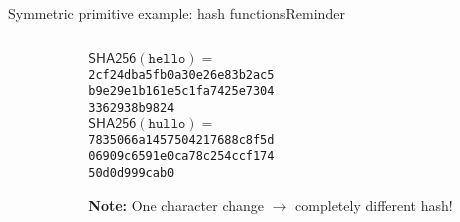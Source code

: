 \documentclass[aspectratio=169, lualatex, handout]{beamer}
\begin{document}
\begin{frame}{Symmetric primitive example: hash functions}{Reminder}
	\begin{columns}[c]
		\begin{column}{0.55\textwidth}
		\end{column}
		\begin{column}{0.45\textwidth}
			\begin{tcolorbox}
				[colback=black!5!white,colframe=ciphergray] $\mathsf{SHA256}(\texttt{hello}) =$ \\ {\small\texttt{2cf24dba5fb0a30e26e83b2ac5}\\ \texttt{b9e29e1b161e5c1fa7425e7304}\\
				\texttt{3362938b9824}}\\[1em]
				$\mathsf{SHA256}(\texttt{hullo}) =$ \\ {\small\texttt{7835066a1457504217688c8f5d}\\
				\texttt{06909c6591e0ca78c254ccf174}\\ \texttt{50d0d999cab0}}
			\end{tcolorbox}
			\textcolor{cipherprimary}{\textbf{Note:} \small One character change $\rightarrow$
				completely different hash!}
		\end{column}
	\end{columns}
\end{frame}
\end{document}
